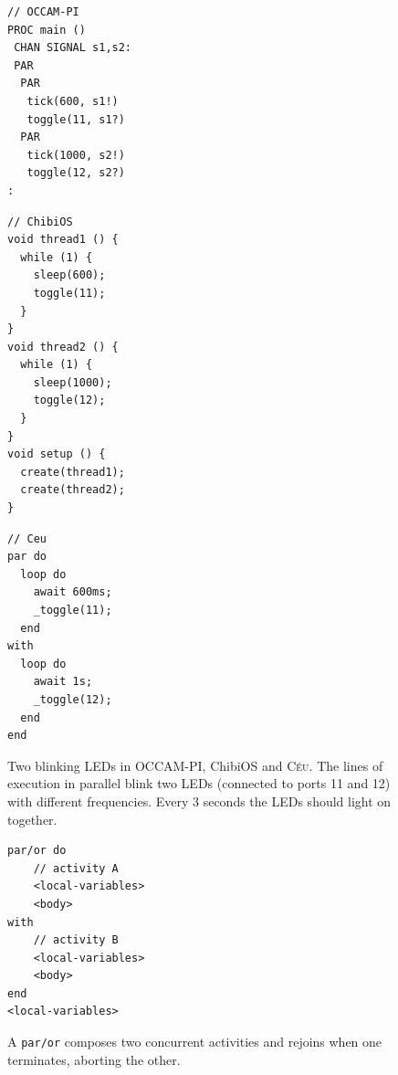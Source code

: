 \documentclass{acm_proc_article-sp}
\newcommand{\CEU}{\textsc{C\'{e}u}\xspace}
\newcommand{\code}[1] {{\small{\texttt{#1}}}}
\newcommand{\1}{\;}
\newcommand{\2}{\;\;}
\newcommand{\3}{\;\;\;}
\newcommand{\5}{\;\;\;\;\;}
\begin{document}
\begin{figure}[t]
\begin{minipage}[t]{0.34\linewidth}
\begin{lstlisting}
// OCCAM-PI
PROC main ()
 CHAN SIGNAL s1,s2:
 PAR
  PAR
   tick(600, s1!)
   toggle(11, s1?)
  PAR
   tick(1000, s2!)
   toggle(12, s2?)
:

\end{lstlisting}
\end{minipage}
%
\begin{minipage}[t]{0.33\linewidth}
\begin{lstlisting}
// ChibiOS
void thread1 () {
  while (1) {
    sleep(600);
    toggle(11);
  }
}
void thread2 () {
  while (1) {
    sleep(1000);
    toggle(12);
  }
}
void setup () {
  create(thread1);
  create(thread2);
}

\end{lstlisting}
\end{minipage}
%
\begin{minipage}[t]{0.31\linewidth}
\begin{lstlisting}
// Ceu
par do
  loop do
    await 600ms;
    _toggle(11);
  end
with
  loop do
    await 1s;
    _toggle(12);
  end
end
\end{lstlisting}
\end{minipage}
%
\caption{ Two blinking LEDs in OCCAM-PI, ChibiOS and \CEU.\newline
{\small %
The lines of execution in parallel blink two LEDs (connected to ports 11 and 
12) with different frequencies.
Every 3 seconds the LEDs should light on together.
}%
\label{lst.leds}
}
\end{figure}


\begin{figure}[t]
\begin{lstlisting}
par/or do
    // activity A
    <local-variables>
    <body>
with
    // activity B
    <local-variables>
    <body>
end
<local-variables>
\end{lstlisting}
\caption{ A \code{par/or} composes two concurrent activities and rejoins when 
one terminates, aborting the other.
\label{lst.abortion}
}
\end{figure}
\end{document}
